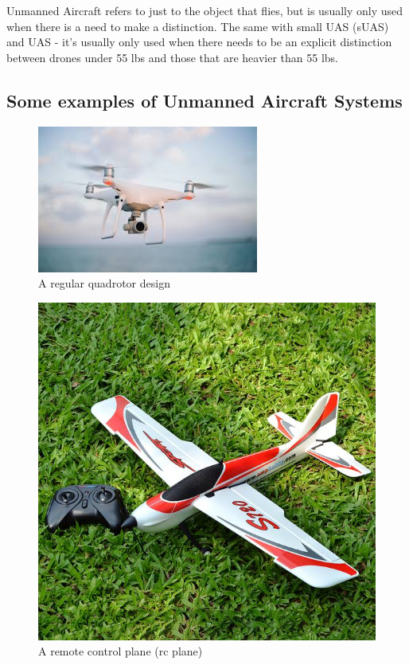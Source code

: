 \documentclass[
]{book}
\theoremstyle{definition}
\theoremstyle{definition}
\theoremstyle{definition}
\theoremstyle{remark}
\begin{document}
Unmanned Aircraft refers to just to the object that flies, but is usually only used when there is a need to make a distinction. The same with small UAS (sUAS) and UAS - it's usually only used when there needs to be an explicit distinction between drones under 55 lbs and those that are heavier than 55 lbs.

\hypertarget{some-examples-of-unmanned-aircraft-systems}{%
\subsection{Some examples of Unmanned Aircraft Systems}\label{some-examples-of-unmanned-aircraft-systems}}

\begin{figure}

{\centering \includegraphics[width=0.5\linewidth]{images/general/quadrotor} 

}

\caption{A regular quadrotor design}\label{fig:quad}
\end{figure}

\begin{figure}

{\centering \includegraphics[width=0.5\linewidth]{images/general/rc_plane} 

}

\caption{A remote control plane (rc plane)}\label{fig:rcplane}
\end{figure}
\end{document}
